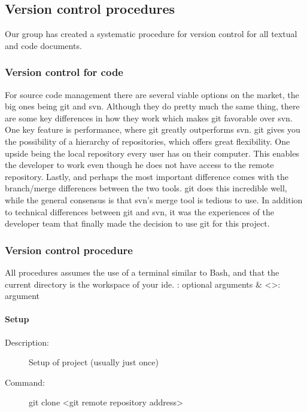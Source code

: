 

\subsection{Version control procedures}
Our group has created a systematic procedure for version control for all textual  and code documents. 

\subsubsection{Version control for code}
For source code management there are several viable options on the market, the big ones being \gls{git} and \gls{svn}. Although they do pretty much the same thing, there are some key differences in how they work which makes \gls{git} favorable over \gls{svn}. One key feature is performance, where \gls{git} greatly outperforms \gls{svn}. \gls{git} gives you the possibility of a hierarchy of repositories, which offers great flexibility. One upside being the local repository every user has on their computer. This enables the developer to work even though he does not have access to the remote repository. Lastly, and perhaps the most important difference comes with the branch/merge differences between the two tools. \gls{git} does this incredible well, while the general consensus is that \gls{svn}’s merge tool is tedious to use.  
\newline
\newline
In addition to technical differences between \gls{git} and \gls{svn}, it was the experiences of the developer team that finally made the decision to use \gls{git} for this project.

\subsubsection{Version control procedure}
All procedures assumes the use of a terminal similar to Bash, and that the current directory is the workspace of your \gls{ide}.
\newline
\newline
[]: optional arguments \& <>: argument

\paragraph{Setup}
\begin{description}
\item[Description:] Setup of project (usually just once)
\item[Command:] git clone <git remote repository address>
\end{description}

